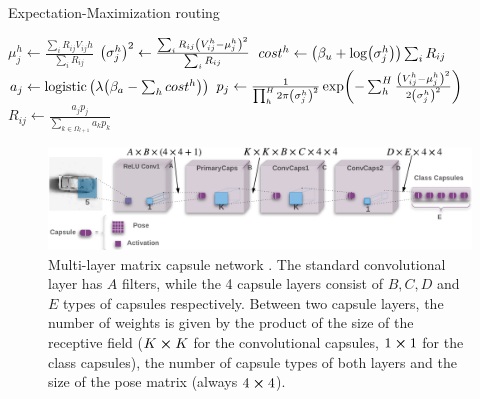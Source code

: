 \begin{algorithm}
\caption{Expectation-Maximization routing}\label{alg:em-routing}
\begin{algorithmic}[1]
        \EndFor
    \EndFor
            \State{}
        \EndFor
            \State{}
        \EndFor
    \EndFor
    \State{}
\EndProcedure
{}
    \EndFor
        \State $\mu_{j}^h \gets \frac{\sum_i R_{ij} V_{ij}h}{\sum_i R_{ij}}$
        \State $\qty(\sigma_j^h)^2 \gets \frac{\sum_i R_{ij} \qty(V_{ij}^h-\mu_j^h)^2}{\sum_i R_{ij}}$
        \State $cost^h \gets \qty(\beta_u + \log(\sigma_j^h))\sum_i R_{ij}$
    \EndFor
    \State $a_j \gets \operatorname{logistic}\qty(\lambda\qty(\beta_a - \sum_h cost^h))$
    \State{}
\EndProcedure
{}
        \State $p_j \gets \frac{1}{\prod_h^H 2\pi \qty(\sigma_j^h)^2}\exp(-\sum_h^H\frac{\qty(V_{ij}^h-\mu_j^h)^2}{2\qty(\sigma_j^h)^2})$
        \State $R_{ij} \gets \frac{a_j p_j}{\sum_{k\in\Omega_{l+1}} a_k p_k}$
        \State{}
    \EndFor
\EndProcedure
\end{algorithmic}
\end{algorithm}
\begin{figure}
    \centering
    \includegraphics[width=\textwidth]{figures/matrix-capsules.png}
\caption[Multi-layer matrix capsule network]{Multi-layer matrix capsule network \cite{hinton2018matrix}. The standard convolutional layer has $A$ filters, while the 4 capsule layers consist of $B,C,D$ and $E$ types of capsules respectively. Between two capsule layers, the number of weights is given by the product of the size of the receptive field ($K\cross K$ for the convolutional capsules, $1\cross 1$ for the class capsules), the number of capsule types of both layers and the size of the pose matrix (always $4\cross 4$).}\label{fig:matrix-capsules}
\end{figure}\noindent